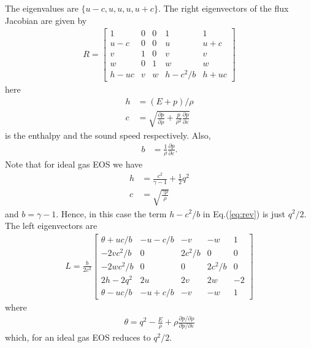 \documentclass[11pt, reqno]{amsart}
\newcommand{\eqr}[1]{Eq.\thinspace(#1)}
\newcommand{\pfrac}[2]{\frac{\partial #1}{\partial #2}}
\newcommand{\pfracb}[2]{\partial #1/\partial #2}
\theoremstyle{definition}
\begin{document}
The eigenvalues are $\{u-c, u, u, u, u+c\}$. The right
eigenvectors of the flux Jacobian are given by
\begin{align}
  R
  =
  \left[
    \begin{matrix}
      1 & 0 & 0 & 1 & 1 \\
      u-c & 0 & 0 & u & u+c \\
      v & 1 & 0 & v & v \\
      w & 0 & 1 & w & w \\
      h-uc & v & w & h-c^2/b & h+uc
    \end{matrix}
  \right]
  \label{eq:rev}
\end{align}
here
\begin{align}
  h &= (E+p)/\rho \\
  c &= \sqrt{\pfrac{p}{\rho} + \frac{p}{\rho^2}\pfrac{p}{\varepsilon}}
\end{align}
is the enthalpy and the sound speed respectively. Also,
\begin{align}
  b &= \frac{1}{\rho}\pfrac{p}{\varepsilon}.
\end{align}
Note that for ideal gas EOS we have
\begin{align}
  h &= \frac{c^2}{\gamma-1} + \frac{1}{2}q^2 \\
  c &= \sqrt{\frac{\gamma p}{\rho}}
\end{align}
and $b=\gamma-1$. Hence, in this case the term $h-c^2/b$ in
\eqr{\ref{eq:rev}} is just $q^2/2$. The left eigenvectors are
\begin{align}
  L
  =
  \frac{b}{2c^2}
  \left[
    \begin{matrix}
      \theta+uc/b & -u-c/b & -v & -w & 1 \\
      -2vc^2/b & 0 & 2c^2/b & 0 & 0 \\
      -2wc^2/b & 0 & 0 & 2c^2/b & 0 \\
      2h-2q^2 & 2u & 2v & 2w & -2 \\
      \theta-uc/b & -u+c/b & -v & -w & 1
    \end{matrix}
  \right]
  \label{eq:rev}
\end{align}
where
\begin{align}
  \theta = q^2 - \frac{E}{\rho} + \rho\frac{\pfracb{p}{\rho}}{\pfracb{p}{\varepsilon}}
\end{align}
which, for an ideal gas EOS reduces to $q^2/2$.
\end{document}
